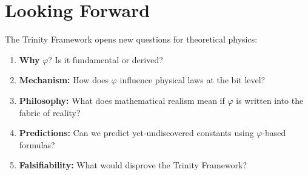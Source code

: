 \section{Looking Forward}

The Trinity Framework opens new questions for theoretical physics:

\begin{enumerate}
    \item \textbf{Why} $\varphi$? Is it fundamental or derived?
    \item \textbf{Mechanism:} How does $\varphi$ influence physical laws at the bit level?
    \item \textbf{Philosophy:} What does mathematical realism mean if $\varphi$ is written into the fabric of reality?
    \item \textbf{Predictions:} Can we predict yet-undiscovered constants using $\varphi$-based formulas?
    \item \textbf{Falsifiability:} What would disprove the Trinity Framework?
\end{enumerate}

\bigskip

